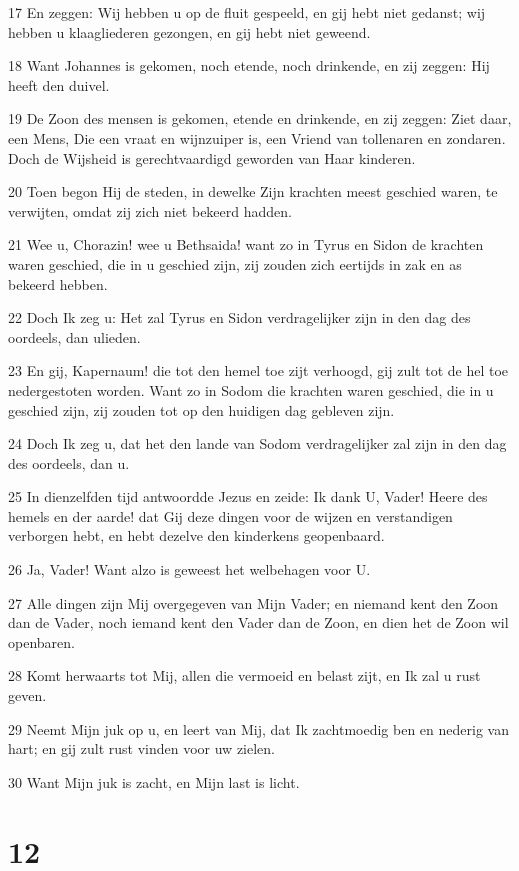 \par 17 En zeggen: Wij hebben u op de fluit gespeeld, en gij hebt niet gedanst; wij hebben u klaagliederen gezongen, en gij hebt niet geweend.
\par 18 Want Johannes is gekomen, noch etende, noch drinkende, en zij zeggen: Hij heeft den duivel.
\par 19 De Zoon des mensen is gekomen, etende en drinkende, en zij zeggen: Ziet daar, een Mens, Die een vraat en wijnzuiper is, een Vriend van tollenaren en zondaren. Doch de Wijsheid is gerechtvaardigd geworden van Haar kinderen.
\par 20 Toen begon Hij de steden, in dewelke Zijn krachten meest geschied waren, te verwijten, omdat zij zich niet bekeerd hadden.
\par 21 Wee u, Chorazin! wee u Bethsaida! want zo in Tyrus en Sidon de krachten waren geschied, die in u geschied zijn, zij zouden zich eertijds in zak en as bekeerd hebben.
\par 22 Doch Ik zeg u: Het zal Tyrus en Sidon verdragelijker zijn in den dag des oordeels, dan ulieden.
\par 23 En gij, Kapernaum! die tot den hemel toe zijt verhoogd, gij zult tot de hel toe nedergestoten worden. Want zo in Sodom die krachten waren geschied, die in u geschied zijn, zij zouden tot op den huidigen dag gebleven zijn.
\par 24 Doch Ik zeg u, dat het den lande van Sodom verdragelijker zal zijn in den dag des oordeels, dan u.
\par 25 In dienzelfden tijd antwoordde Jezus en zeide: Ik dank U, Vader! Heere des hemels en der aarde! dat Gij deze dingen voor de wijzen en verstandigen verborgen hebt, en hebt dezelve den kinderkens geopenbaard.
\par 26 Ja, Vader! Want alzo is geweest het welbehagen voor U.
\par 27 Alle dingen zijn Mij overgegeven van Mijn Vader; en niemand kent den Zoon dan de Vader, noch iemand kent den Vader dan de Zoon, en dien het de Zoon wil openbaren.
\par 28 Komt herwaarts tot Mij, allen die vermoeid en belast zijt, en Ik zal u rust geven.
\par 29 Neemt Mijn juk op u, en leert van Mij, dat Ik zachtmoedig ben en nederig van hart; en gij zult rust vinden voor uw zielen.
\par 30 Want Mijn juk is zacht, en Mijn last is licht.

\chapter{12}

